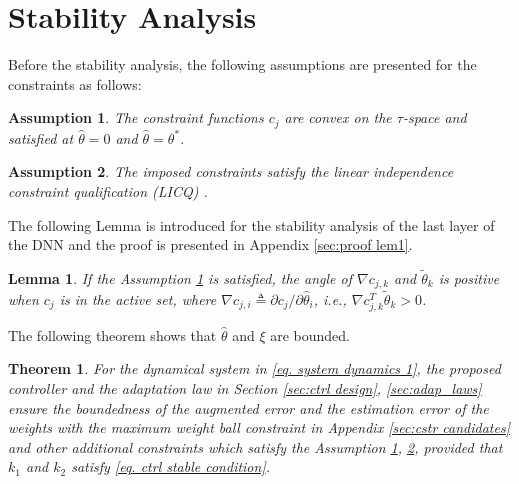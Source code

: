 \documentclass[lettersize,journal]{IEEEtran}
\newtheorem{assum}{Assumption}
\newtheorem{lem}{Lemma}
\newtheorem{theorem}{Theorem}
\begin{document}
\section{Stability Analysis}\label{sec:stability}

Before the stability analysis, the following assumptions are presented for the constraints as follows:
\begin{assum}
    The constraint functions $c_j$ are convex on the $\tau$-space and satisfied at $\hat\theta=0$ and $\hat\theta = \theta^*$.
    \label{assum1}
\end{assum}

\begin{assum}
    The imposed constraints satisfy the linear independence constraint qualification (LICQ) \cite[Chap.~12 Def.~12.1]{RN22}.
    \label{assum2}
\end{assum}

The following Lemma is introduced for the stability analysis of the last layer of the DNN and the proof is presented in Appendix \ref{sec:proof lem1}.
\begin{lem}
    If the Assumption \ref{assum1} is satisfied, the angle of $\nabla c_{j,k}$ and $\tilde\theta_k$ is positive when $c_j$ is in the active set, where $\nabla c_{j,i}\triangleq \partial c_j/\partial \hat\theta_i$, i.e., $\nabla c_{j,k}^T\tilde\theta_k>0$.
    \label{lem1}
\end{lem}

The following theorem shows that $\hat\theta$ and $\xi$ are bounded.

\begin{theorem}
    For the dynamical system in \eqref{eq. system dynamics 1}, the proposed controller and the adaptation law in Section \ref{sec:ctrl design}, \ref{sec:adap_laws} ensure the boundedness of the augmented error and the estimation error of the weights with the maximum weight ball constraint in Appendix \ref{sec:cstr candidates} and other additional constraints which satisfy the Assumption \ref{assum1}, \ref{assum2}, provided that $k_1$ and $k_2$ satisfy \eqref{eq. ctrl stable condition}.
\end{theorem}
\end{document}

